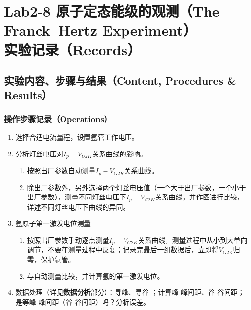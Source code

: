 \documentclass[dvipsnames, svgnames,a4paper,11pt]{article}
\begin{document}
	\section{Lab2-8 原子定态能级的观测（The Franck–Hertz Experiment）\\ \quad\heiti 实验记录（Records）}
	
	\subsection{实验内容、步骤与结果（Content, Procedures \& Results）}
	
	\subsubsection{操作步骤记录（Operations）}
	\begin{enumerate}
		\item 选择合适电流量程，设置氩管工作电压。 
		
		\item 分析灯丝电压对$I_p-V_{G2K}$关系曲线的影响。
		\begin{enumerate}
			\item 按照出厂参数自动测量$I_p-V_{G2K}$关系曲线。
			
			\item 除出厂参数外，另外选择两个灯丝电压值（一个大于出厂参数，一个小于出厂参数），测量不同灯丝电压下$I_p-V_{G2K}$关系曲线，并作图进行比较，详述不同灯丝电压下曲线的异同。
		\end{enumerate}
		
		\item 氩原子第一激发电位测量
		\begin{enumerate}
			\item 按照出厂参数手动逐点测量$I_p-V_{G2K}$关系曲线，测量过程中从小到大单向调节，不要在测量过程中反复；记录完最后一组数据后，立即将$V_{G2K}$归零，保护氩管。
			
			\item 与自动测量比较，并计算氩的第一激发电位。
		\end{enumerate}
		
		\item 数据处理（详见\textbf{数据分析}部分）：寻峰、寻谷 ；计算峰-峰间距、谷-谷间距；是等峰-峰间距（谷-谷间距）吗？分析误差。
		
	\end{enumerate}	
	
\end{document}
